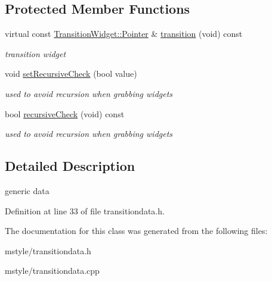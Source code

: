 \subsection*{Protected Member Functions}
\begin{DoxyCompactItemize}
\item 
\mbox{\label{class_transition_data_a7e9788dd3dd1110d8780c29ed39ac9a3}} 
virtual const \hyperlink{class_transition_widget_a731ea04484c77905b13d790cf1ffb66e}{Transition\+Widget\+::\+Pointer} \& \hyperlink{class_transition_data_a7e9788dd3dd1110d8780c29ed39ac9a3}{transition} (void) const
\begin{DoxyCompactList}\small\item\em transition widget \end{DoxyCompactList}\item 
\mbox{\label{class_transition_data_a492e4dcc54be0c2a5f487da5fbee3764}} 
void \hyperlink{class_transition_data_a492e4dcc54be0c2a5f487da5fbee3764}{set\+Recursive\+Check} (bool value)
\begin{DoxyCompactList}\small\item\em used to avoid recursion when grabbing widgets \end{DoxyCompactList}\item 
\mbox{\label{class_transition_data_a3a6fb18b0fa0e9c3b501229cbec2cf3f}} 
bool \hyperlink{class_transition_data_a3a6fb18b0fa0e9c3b501229cbec2cf3f}{recursive\+Check} (void) const
\begin{DoxyCompactList}\small\item\em used to avoid recursion when grabbing widgets \end{DoxyCompactList}\end{DoxyCompactItemize}


\subsection{Detailed Description}
generic data 

Definition at line 33 of file transitiondata.\+h.



The documentation for this class was generated from the following files\+:\begin{DoxyCompactItemize}
\item 
mstyle/transitiondata.\+h\item 
mstyle/transitiondata.\+cpp\end{DoxyCompactItemize}

